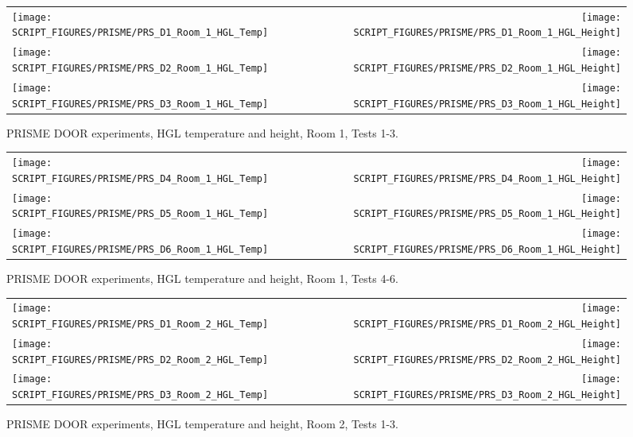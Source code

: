 \begin{figure}[!ht]
\begin{tabular*}{\textwidth}{l@{\extracolsep{\fill}}r}
\texttt{[image: SCRIPT\_FIGURES/PRISME/PRS\_D1\_Room\_1\_HGL\_Temp]} &
\texttt{[image: SCRIPT\_FIGURES/PRISME/PRS\_D1\_Room\_1\_HGL\_Height]} \\
\texttt{[image: SCRIPT\_FIGURES/PRISME/PRS\_D2\_Room\_1\_HGL\_Temp]} &
\texttt{[image: SCRIPT\_FIGURES/PRISME/PRS\_D2\_Room\_1\_HGL\_Height]} \\
\texttt{[image: SCRIPT\_FIGURES/PRISME/PRS\_D3\_Room\_1\_HGL\_Temp]} &
\texttt{[image: SCRIPT\_FIGURES/PRISME/PRS\_D3\_Room\_1\_HGL\_Height]}
\end{tabular*}
\caption[PRISME DOOR experiments, HGL temperature and height, Room 1, Tests 1-3]
{PRISME DOOR experiments, HGL temperature and height, Room 1, Tests 1-3.}
\label{PRISME_HGL_1}
\end{figure}

\begin{figure}[p]
\begin{tabular*}{\textwidth}{l@{\extracolsep{\fill}}r}
\texttt{[image: SCRIPT\_FIGURES/PRISME/PRS\_D4\_Room\_1\_HGL\_Temp]} &
\texttt{[image: SCRIPT\_FIGURES/PRISME/PRS\_D4\_Room\_1\_HGL\_Height]} \\
\texttt{[image: SCRIPT\_FIGURES/PRISME/PRS\_D5\_Room\_1\_HGL\_Temp]} &
\texttt{[image: SCRIPT\_FIGURES/PRISME/PRS\_D5\_Room\_1\_HGL\_Height]} \\
\texttt{[image: SCRIPT\_FIGURES/PRISME/PRS\_D6\_Room\_1\_HGL\_Temp]} &
\texttt{[image: SCRIPT\_FIGURES/PRISME/PRS\_D6\_Room\_1\_HGL\_Height]}
\end{tabular*}
\caption[PRISME DOOR experiments, HGL temperature and height, Room 1, Tests 4-6]
{PRISME DOOR experiments, HGL temperature and height, Room 1, Tests 4-6.}
\label{PRISME_HGL_2}
\end{figure}

\begin{figure}[p]
\begin{tabular*}{\textwidth}{l@{\extracolsep{\fill}}r}
\texttt{[image: SCRIPT\_FIGURES/PRISME/PRS\_D1\_Room\_2\_HGL\_Temp]} &
\texttt{[image: SCRIPT\_FIGURES/PRISME/PRS\_D1\_Room\_2\_HGL\_Height]} \\
\texttt{[image: SCRIPT\_FIGURES/PRISME/PRS\_D2\_Room\_2\_HGL\_Temp]} &
\texttt{[image: SCRIPT\_FIGURES/PRISME/PRS\_D2\_Room\_2\_HGL\_Height]} \\
\texttt{[image: SCRIPT\_FIGURES/PRISME/PRS\_D3\_Room\_2\_HGL\_Temp]} &
\texttt{[image: SCRIPT\_FIGURES/PRISME/PRS\_D3\_Room\_2\_HGL\_Height]}
\end{tabular*}
\caption[PRISME DOOR experiments, HGL temperature and height, Room 2, Tests 1-3]
{PRISME DOOR experiments, HGL temperature and height, Room 2, Tests 1-3.}
\label{PRISME_HGL_3}
\end{figure}


